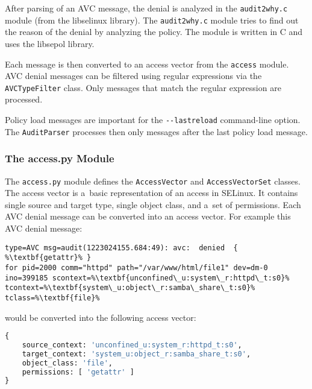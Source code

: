 After parsing of an AVC message, the denial is analyzed in the \texttt{audit2why.c}
module (from the libselinux library). The \texttt{audit2why.c} module tries to
find out the reason of the denial by analyzing the policy. The module is written
in C and uses the libsepol library.

Each message is then converted to an access vector from the \texttt{access}
module. AVC denial messages can be filtered using regular expressions via the
\texttt{AVCTypeFilter} class. Only messages that match the regular expression
are processed.

Policy load messages are important for the \texttt{-{}-lastreload} command-line
option. The \texttt{AuditParser} processes then only messages after the last
policy load message.

\subsubsection{The access.py Module}

The \texttt{access.py} module defines the \texttt{AccessVector} and
\texttt{AccessVectorSet} classes. The access vector is a~basic representation of
an access in SELinux. It contains single source and target type, single object
class, and a~set of permissions. Each AVC denial message can be converted into
an access vector. For example this AVC denial message:
\begin{lstlisting}[escapechar=\%]
type=AVC msg=audit(1223024155.684:49): avc:  denied  { %\textbf{getattr}% }
for pid=2000 comm="httpd" path="/var/www/html/file1" dev=dm-0
ino=399185 scontext=%\textbf{unconfined\_u:system\_r:httpd\_t:s0}%
tcontext=%\textbf{system\_u:object\_r:samba\_share\_t:s0}% tclass=%\textbf{file}%
\end{lstlisting}
would be converted into the following access vector:
\begin{lstlisting}[language=Python]
{
    source_context: 'unconfined_u:system_r:httpd_t:s0',
    target_context: 'system_u:object_r:samba_share_t:s0',
    object_class: 'file',
    permissions: [ 'getattr' ]
}
\end{lstlisting}


